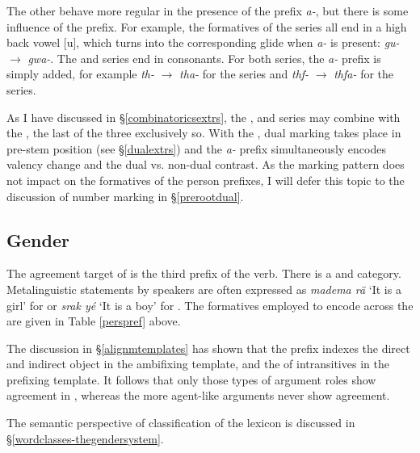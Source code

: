 The other  behave more regular in the presence of the  prefix \emph{a-}, but there is some influence of the  prefix. For example, the formatives of the \Betatwo{} series all end in a high back vowel [u], which turns into the corresponding glide when \emph{a-} is present: \Ssg{} \emph{gu-} $\rightarrow$ \emph{gwa-}. The \Bet{} and \Betatwo{} series end in consonants. For both series, the \emph{a-} prefix is simply added, for example \Stnsg{} \emph{th-} $\rightarrow$ \emph{tha-} for the \Bet{} series and \Stnsg{} \emph{thf-} $\rightarrow$ \emph{thfa-} for the \Betatwo{} series.%

As I have discussed in \S{}\ref{combinatoricsextrs}, the \Bet{}, \Betaone{} and \Gam{} series may combine with the , the last of the three exclusively so. With the , dual marking takes place in pre-stem position (see \S{}\ref{dualextrs}) and the \emph{a-} prefix simultaneously encodes valency change and the dual vs. non-dual contrast. As the marking pattern does not impact on the formatives of the person prefixes, I will defer this topic to the discussion of number marking in \S{}\ref{prerootdual}.

\subsection{Gender} \label{gendersubsec}

The agreement target of  is the third  prefix of the verb. There is a  and   category. Metalinguistic statements by speakers are often expressed as \emph{madema rä} `It is a girl' for  or \emph{srak yé} `It is a boy' for . The formatives employed to encode  across the  are given in Table \ref{perspref} above.%

The discussion in \S{}\ref{alignmtemplates} has shown that the prefix indexes the direct and indirect object in the ambifixing  template, and the  of intransitives in the prefixing template. It follows that only those types of argument roles show agreement in , whereas the more agent-like arguments never show  agreement.%

The semantic perspective of  classification of the  lexicon is discussed in \S{}\ref{wordclasses-thegendersystem}.

